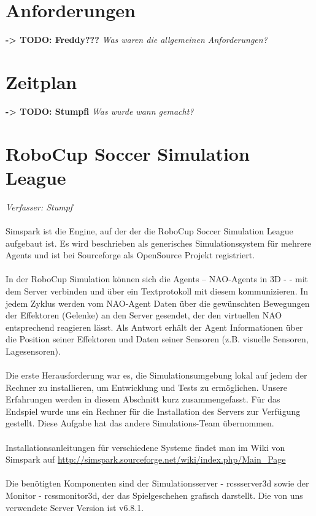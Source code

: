 \documentclass[fontsize=12pt,a4paper,final]{scrartcl}[2003/01/01]
\begin{document}
\section{Anforderungen}
\textbf{-> TODO: Freddy???}
\textit{Was waren die allgemeinen Anforderungen?}
\section{Zeitplan}
\textbf{-> TODO: Stumpfi}
\textit{Was wurde wann gemacht?}
\section{RoboCup Soccer Simulation League}
\textit{Verfasser: Stumpf}\\
\\
Simspark ist die Engine, auf der der die RoboCup Soccer Simulation League aufgebaut ist. Es wird beschrieben als generisches Simulationssystem für mehrere Agents und ist bei Sourceforge als OpenSource Projekt registriert.\\
\\
In der RoboCup Simulation können sich die Agents -- NAO-Agents in 3D - - mit dem Server verbinden und über ein Textprotokoll mit diesem kommunizieren. In jedem Zyklus werden vom NAO-Agent Daten über die gewünschten Bewegungen der Effektoren (Gelenke) an den Server gesendet, der den virtuellen NAO entsprechend reagieren lässt. Als Antwort erhält der Agent Informationen über die Position seiner Effektoren und Daten seiner Sensoren (z.B. visuelle Sensoren, Lagesensoren).\\
\\
Die erste Herausforderung war es, die Simulationsumgebung lokal auf jedem der Rechner zu installieren, um Entwicklung und Tests zu ermöglichen. Unsere Erfahrungen werden in diesem Abschnitt kurz zusammengefasst. Für das Endspiel wurde uns ein Rechner für die Installation des Servers zur Verfügung gestellt. Diese Aufgabe hat das andere Simulations-Team übernommen.\\
\\
Installationsanleitungen für verschiedene Systeme findet man im Wiki von Simspark auf \href{http://simspark.sourceforge.net/wiki/index.php/Main_Page}{http://simspark.sourceforge.net/wiki/index.php/Main\_Page}\\
\\
Die benötigten Komponenten sind der Simulationsserver - rcssserver3d sowie der Monitor - rcssmonitor3d, der das Spielgeschehen grafisch darstellt. Die von uns verwendete Server Version ist v6.8.1.
\end{document}
